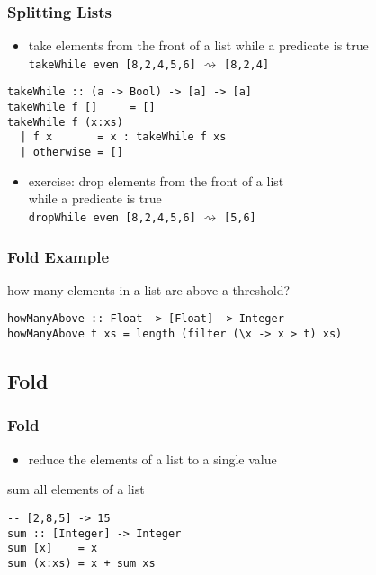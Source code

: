 \documentclass[dvipsnames]{beamer}
\theoremstyle{plain}
\begin{document}
\begin{frame}[fragile]
  \frametitle{Splitting Lists}

  \begin{itemize}
    \item take elements from the front of a list while a predicate is true\\
      \lstinline{takeWhile even [8,2,4,5,6]} $\rightsquigarrow$
      \lstinline{[8,2,4]}
  \end{itemize}

  \begin{exampleblock}{}
    \begin{lstlisting}
takeWhile :: (a -> Bool) -> [a] -> [a]
takeWhile f []     = []
takeWhile f (x:xs)
  | f x       = x : takeWhile f xs
  | otherwise = []
    \end{lstlisting}
  \end{exampleblock}

  \pause
  \begin{itemize}
    \item exercise: drop elements from the front of a list\\
      while a predicate is true\\
      \lstinline{dropWhile even [8,2,4,5,6]} $\rightsquigarrow$
      \lstinline{[5,6]}
  \end{itemize}
\end{frame}

\begin{frame}[fragile]
  \frametitle{Fold Example}

  \begin{exampleblock}{how many elements in a list are above a threshold?}
    \begin{lstlisting}
howManyAbove :: Float -> [Float] -> Integer
howManyAbove t xs = length (filter (\x -> x > t) xs)
    \end{lstlisting}
  \end{exampleblock}
\end{frame}

\subsection{Fold}

\begin{frame}[fragile]
  \frametitle{Fold}

  \begin{itemize}
    \item reduce the elements of a list to a single value
  \end{itemize}

  \begin{exampleblock}{sum all elements of a list}
    \begin{lstlisting}
-- [2,8,5] -> 15
sum :: [Integer] -> Integer
sum [x]    = x
sum (x:xs) = x + sum xs
    \end{lstlisting}
  \end{exampleblock}
\end{frame}
\end{document}
